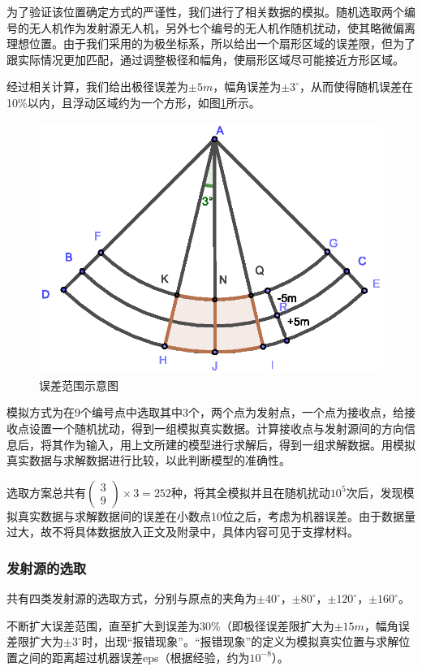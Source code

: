 \documentclass{ctexart}
\begin{document}
为了验证该位置确定方式的严谨性，我们进行了相关数据的模拟。随机选取两个编号的无人机作为发射源无人机，另外七个编号的无人机作随机扰动，使其略微偏离理想位置。由于我们采用的为极坐标系，所以给出一个扇形区域的误差限，但为了跟实际情况更加匹配，通过调整极径和幅角，使扇形区域尽可能接近方形区域。

经过相关计算，我们给出极径误差为$\pm 5m $，幅角误差为$\pm 3^{\circ}$，从而使得随机误差在10\%以内，且浮动区域约为一个方形，如图\ref{误差范围示意图}所示。

\begin{figure}[H]
  \centering
  \includegraphics[width=0.45\linewidth]{pic/error area.eps}
  \caption{误差范围示意图}
  \label{误差范围示意图}
  \end{figure}

模拟方式为在9个编号点中选取其中3个，两个点为发射点，一个点为接收点，给接收点设置一个随机扰动，得到一组模拟真实数据。计算接收点与发射源间的方向信息后，将其作为输入，用上文所建的模型进行求解后，得到一组求解数据。用模拟真实数据与求解数据进行比较，以此判断模型的准确性。

选取方案总共有$\begin{pmatrix} 3 \\ 9 \end{pmatrix}\times 3=252$种，将其全模拟并且在随机扰动$10^5$次后，发现模拟真实数据与求解数据间的误差在小数点10位之后，考虑为机器误差。由于数据量过大，故不将具体数据放入正文及附录中，具体内容可见于支撑材料。

\subsubsection{发射源的选取}

共有四类发射源的选取方式，分别与原点的夹角为$\pm 40^{\circ}$，$\pm 80^{\circ}$，$\pm 120^{\circ}$，$\pm 160^{\circ}$。

不断扩大误差范围，直至扩大到误差为30\%（即极径误差限扩大为$\pm 15m$，幅角误差限扩大为$\pm 3^{\circ}$时，出现“报错现象”。“报错现象”的定义为模拟真实位置与求解位置之间的距离超过机器误差eps（根据经验，约为$10^{-8}$）。
\end{document}
